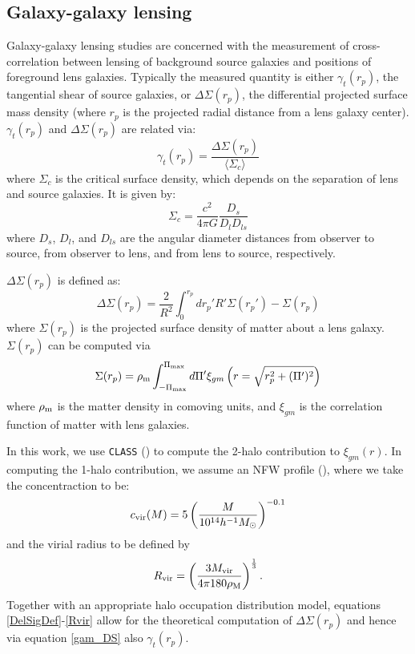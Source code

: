 \documentclass[a4paper,fleqn,usenatbib]{mnras}
\begin{document}
\subsection{Galaxy-galaxy lensing}
\label{subsec:ggl_theory}
\noindent
Galaxy-galaxy lensing studies are concerned with the measurement of cross-correlation between lensing of background source galaxies and positions of foreground lens galaxies. Typically the measured quantity is either $\gamma_t(r_p)$, the tangential shear of source galaxies, or $\Delta \Sigma(r_p)$, the differential projected surface mass density (where $r_p$ is the projected radial distance from a lens galaxy center). $\gamma_t(r_p)$ and $\Delta \Sigma(r_p)$ are related via:
\begin{equation}
\gamma_t(r_p) = \frac{\Delta \Sigma(r_p)}{\langle \Sigma_c \rangle}
\label{gam_DS}
\end{equation}
where $\Sigma_c$ is the critical surface density, which depends on the separation of lens and source galaxies. It is given by:
\begin{equation}
\Sigma_c = \frac{c^2}{4\pi G}\frac{D_s}{D_l D_{ls}}
\label{SigmaC}
\end{equation}
where $D_s$, $D_l$, and $D_{ls}$ are the angular diameter distances from observer to source, from observer to lens, and from lens to source, respectively. 

$\Delta \Sigma(r_p)$ is defined as:
\begin{equation}
\Delta \Sigma(r_p) = \frac{2}{R^2} \int_0^{r_p} dr_p' R' \Sigma(r_p') - \Sigma(r_p)
\label{DelSigDef}
\end{equation}
where $\Sigma(r_p)$ is the projected surface density of matter about a lens galaxy. $\Sigma(r_p)$ can be computed via
\begin{equation}
\Sigma(r_p) = \rho_{\rm m} \int_{-\Pi_{\rm max}}^{\Pi_{\rm max}} d\Pi^\prime \xi_{gm}\left(r=\sqrt{r_p^2 + (\Pi^\prime)^2}\right)
\label{Sigma}
\end{equation}
where $\rho_{\rm m}$ is the matter density in comoving units, and $\xi_{gm}$ is the correlation function of matter with lens galaxies. 

In this work, we use {\tt CLASS} (\cite{Lesgourges2011}) to compute the 2-halo contribution to $\xi_{gm}(r)$. In computing the 1-halo contribution, we assume an NFW profile (\cite{Navarro1997}), where we take the concentraction to be:
\begin{equation}
c_{\rm vir}(M) = 5\left(\frac{M}{10^{14}h^{-1}M_{\odot}}\right)^{-0.1}
\label{cvir}
\end{equation} 
and the virial radius to be defined by 
\begin{equation}
R_{\rm vir} = \left(\frac{3 M_{\rm vir}}{4 \pi 180 \rho_{\rm M}} \right)^{\frac{1}{3}}.
\label{Rvir}
\end{equation}
Together with an appropriate halo occupation distribution model, equations \ref{DelSigDef}-\ref{Rvir} allow for the theoretical computation of $\Delta \Sigma(r_p)$ and hence via equation \ref{gam_DS} also $\gamma_t(r_p)$.
\end{document}
